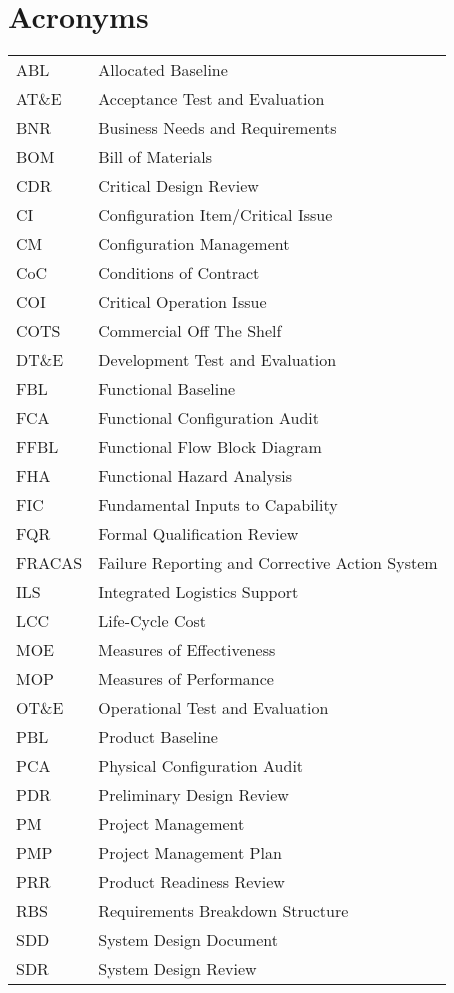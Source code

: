 \documentclass[journal]{IEEEtran}
\begin{document}
\section{Acronyms}
\begin{tabular}{ l l }
ABL & Allocated Baseline \\ 
AT\&E & Acceptance Test and Evaluation \\
BNR & Business Needs and Requirements \\
BOM & Bill of Materials \\
CDR & Critical Design Review \\
CI & Configuration Item/Critical Issue \\
CM & Configuration Management \\
CoC & Conditions of Contract \\
COI & Critical Operation Issue \\
COTS & Commercial Off The Shelf \\
DT\&E & Development Test and Evaluation \\
FBL & Functional Baseline \\
FCA & Functional Configuration Audit \\
FFBL & Functional Flow Block Diagram \\
FHA & Functional Hazard Analysis \\
FIC & Fundamental Inputs to Capability \\
FQR & Formal Qualification Review \\
FRACAS & Failure Reporting and Corrective Action System \\
ILS & Integrated Logistics Support \\
LCC & Life-Cycle Cost \\
MOE & Measures of Effectiveness \\
MOP & Measures of Performance \\
OT\&E & Operational Test and Evaluation \\
PBL & Product Baseline \\
PCA & Physical Configuration Audit \\
PDR & Preliminary Design Review \\
PM & Project Management \\
PMP & Project Management Plan \\
PRR & Product Readiness Review \\
RBS & Requirements Breakdown Structure \\
SDD & System Design Document \\
SDR & System Design Review \\

\end{tabular}
\end{document}
